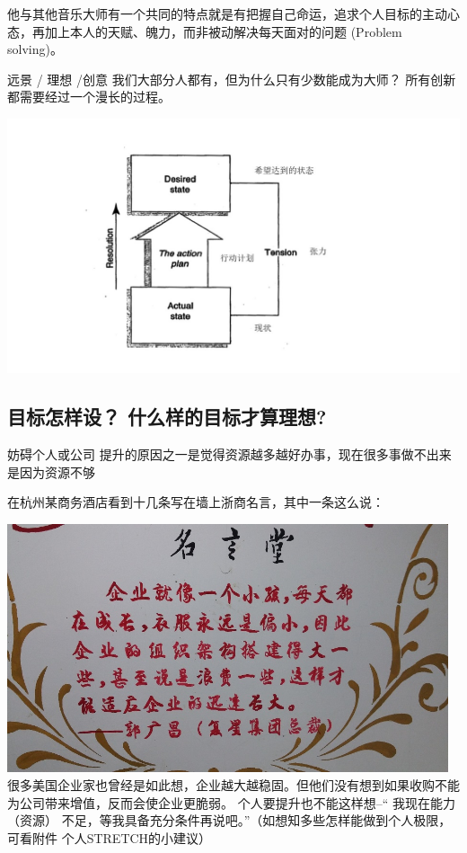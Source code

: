 他与其他音乐大师有一个共同的特点就是有把握自己命运，追求个人目标的主动心态，再加上本人的天赋、魄力，而非被动解决每天面对的问题
(Problem solving)。

远景 / 理想 /创意 我们大部分人都有，但为什么只有少数能成为大师？
所有创新都需要经过一个漫长的过程。

\includegraphics[width=20cm]{liuct.jpg}\\

\hypertarget{ux76eeux6807ux600eux6837ux8bbe-ux4ec0ux4e48ux6837ux7684ux76eeux6807ux624dux7b97ux7406ux60f3}{%
\subsection{目标怎样设？
什么样的目标才算理想?}\label{ux76eeux6807ux600eux6837ux8bbe-ux4ec0ux4e48ux6837ux7684ux76eeux6807ux624dux7b97ux7406ux60f3}}

妨碍个人或公司
提升的原因之一是觉得资源越多越好办事，现在很多事做不出来是因为资源不够


在杭州某商务酒店看到十几条写在墙上浙商名言，其中一条这么说：

\includegraphics[width=13cm]{mingyant.jpg}\\
很多美国企业家也曾经是如此想，企业越大越稳固。但他们没有想到如果收购不能为公司带来增值，反而会使企业更脆弱。
个人要提升也不能这样想--`` 我现在能力 （资源）
不足，等我具备充分条件再说吧。''（如想知多些怎样能做到个人极限，可看附件
个人STRETCH的小建议）

